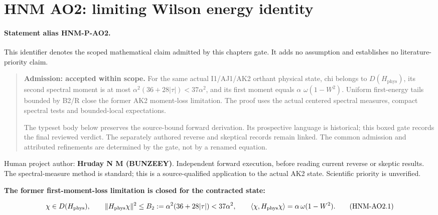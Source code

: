 \hypertarget{r29-ao2-ao2-forward-hnm-limiting-wilson-energy-identity}{%
\section{HNM AO2: limiting Wilson energy identity\workstar}\label{r29:ao2:r29-ao2-ao2-forward-hnm-limiting-wilson-energy-identity}}
\paragraph{Statement alias HNM-P-AO2.}\label{stmt:AO2} This identifier denotes the scoped mathematical claim admitted by this chapter\textquotesingle s gate. It adds no assumption and establishes no literature-priority claim.

\begin{quote}\small \textbf{Admission: accepted within scope.} For the same actual I1/AJ1/AK2 orthant physical state, chi belongs to \(D(H_{\mathrm{phys}})\), its second spectral moment is at most \(\alpha^{2}(36+28|\tau|)<37\alpha^{2}\), and its first moment equals \(\alpha\) \(\omega(1-W^{2})\). Uniform first-energy tails bounded by B2/R close the former AK2 moment-loss limitation. The proof uses the actual centered spectral measures, compact spectral tests and bounded-local expectations.\par The typeset body below preserves the source-bound forward derivation. Its prospective language is historical; this boxed gate records the final reviewed verdict. The separately authored reverse and skeptical records remain linked. The common admission and attributed refinements are determined by the gate, not by a renamed equation.\end{quote}
Human project author: \textbf{Hruday N M (BUNZEEY)}. Independent forward execution, before reading current reverse or skeptic results. The spectral-measure method is standard; this is a source-qualified application to the actual AK2 state. Scientific priority is unverified.

\textbf{The former first-moment-loss limitation is closed for the contracted state:}

\begin{equation}
\chi\in D(H_{\rm phys}),\qquad
\|H_{\rm phys}\chi\|^2\le B_2:=\alpha^2(36+28|\tau|)<37\alpha^2,
\qquad
\langle\chi,H_{\rm phys}\chi\rangle
=\alpha\,\omega(1-W^2).\tag{HNM-AO2.1}
\label{r29:ao2:eq1}
\end{equation}

